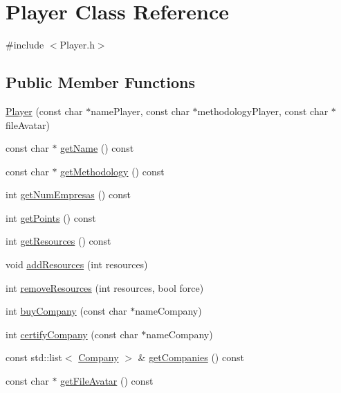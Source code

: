 \hypertarget{classPlayer}{\section{Player Class Reference}
\label{classPlayer}
}


{\ttfamily \#include $<$Player.\-h$>$}

\subsection*{Public Member Functions}
\begin{DoxyCompactItemize}
\item 
\hyperlink{classPlayer_a71bfdf4e61822929e6cc678159653b9f}{Player} (const char $\ast$name\-Player, const char $\ast$methodology\-Player, const char $\ast$file\-Avatar)
\item 
const char $\ast$ \hyperlink{classPlayer_a63af5762c820d47e9ed31915ac0ceed9}{get\-Name} () const 
\item 
const char $\ast$ \hyperlink{classPlayer_ad98ff5b24bb1ddc41f0390d50ceac3a4}{get\-Methodology} () const 
\item 
int \hyperlink{classPlayer_acd9a2131d61ae05f83063900b205d9ff}{get\-Num\-Empresas} () const 
\item 
int \hyperlink{classPlayer_a2d9d894f68e52cc6d9dfdbc0e6cd3e53}{get\-Points} () const 
\item 
int \hyperlink{classPlayer_abfaf379855ef276b27da1bd47d7b037d}{get\-Resources} () const 
\item 
void \hyperlink{classPlayer_ab4beffed28357e5e05f601a7290c9fb8}{add\-Resources} (int resources)
\item 
int \hyperlink{classPlayer_afd36b40cd4f3950f2e3516904c4b6fba}{remove\-Resources} (int resources, bool force)
\item 
int \hyperlink{classPlayer_a0bc0123924856c22e17fd932114f268a}{buy\-Company} (const char $\ast$name\-Company)
\item 
int \hyperlink{classPlayer_aecc72601f8778fc18a767a450e1fb7e8}{certify\-Company} (const char $\ast$name\-Company)
\item 
const std\-::list$<$ \hyperlink{classCompany}{Company} $>$ \& \hyperlink{classPlayer_a8bca0e3d8ce5e75e0798aba334e9763b}{get\-Companies} () const 
\item 
const char $\ast$ \hyperlink{classPlayer_addd52384a5062bc06c6fa4d4cf381f86}{get\-File\-Avatar} () const 
\end{DoxyCompactItemize}


